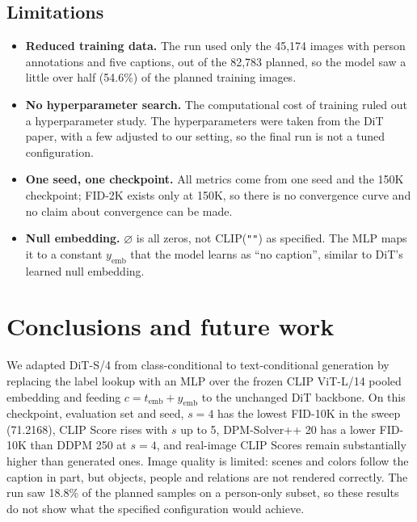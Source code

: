 \documentclass{article}
\newcommand{\nullemb}{\varnothing}
\newcommand{\temb}{t_{\mathrm{emb}}}
\newcommand{\yemb}{y_{\mathrm{emb}}}
\begin{document}
\subsection{Limitations}

\begin{itemize}
    \item \textbf{Reduced training data.} The run used only the 45,174 images with person annotations and five captions, out of the 82,783 planned, so the model saw a little over half (54.6\%) of the planned training images.
  \item \textbf{No hyperparameter search.} The computational cost of training ruled out a hyperparameter study. The hyperparameters were taken from the DiT paper, with a few adjusted to our setting, so the final run is not a tuned configuration.
  \item \textbf{One seed, one checkpoint.} All metrics come from one seed and the 150K checkpoint; FID-2K exists only at 150K, so there is no convergence curve and no claim about convergence can be made.
  \item \textbf{Null embedding.} $\nullemb$ is all zeros, not CLIP(\texttt{""}) as specified. The MLP maps it to a constant $\yemb$ that the model learns as ``no caption'', similar to DiT's learned null embedding.
\end{itemize}

\section{Conclusions and future work}

We adapted DiT-S/4 from class-conditional to text-conditional generation by replacing the label lookup with an MLP over the frozen CLIP ViT-L/14 pooled embedding and feeding $c=\temb+\yemb$ to the unchanged DiT backbone.
On this checkpoint, evaluation set and seed, $s=4$ has the lowest FID-10K in the sweep (71.2168), CLIP Score rises with $s$ up to 5, DPM-Solver++ 20 has a lower FID-10K than DDPM 250 at $s=4$, and real-image CLIP Scores remain substantially higher than generated ones.
Image quality is limited: scenes and colors follow the caption in part, but objects, people and relations are not rendered correctly.
The run saw 18.8\% of the planned samples on a person-only subset, so these results do not show what the specified configuration would achieve.
\end{document}

